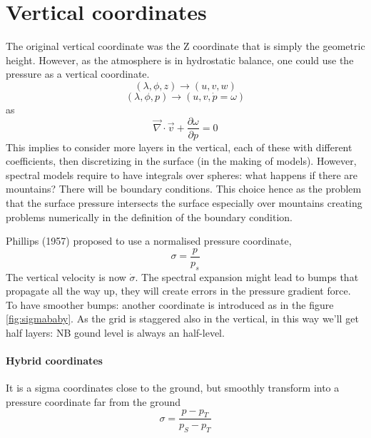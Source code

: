 \section{Vertical coordinates}
The original vertical coordinate was the Z coordinate that is simply the
geometric height. However, as the atmosphere is in hydrostatic balance, one could use the pressure as a vertical coordinate.
$$(\lambda, \phi, z)\rightarrow(u,v,w) $$
$$(\lambda, \phi, p)\rightarrow (u,v,\dot{p}=\omega)$$
as $$\vec{\nabla}\cdot\vec{v}+\frac{\partial\omega}{\partial p}=0$$
This implies to consider more layers in the vertical, each of these with different coefficients, then discretizing in the surface (in the making of models).
However, spectral models require to have integrals over spheres: what happens if there are mountains? There will be boundary conditions.
This choice hence as the problem that the surface pressure intersects the surface especially over mountains creating problems numerically in the definition of the boundary condition.

Phillips (1957) proposed to use a normalised pressure coordinate, $$\sigma=\frac{p}{p_s}$$ The vertical velocity is now $\dot{\sigma}$. The spectral expansion might lead to bumps that propagate all the way up, they will create errors in the pressure gradient force. To have smoother bumps: another coordinate is introduced as in the figure \ref{fig:sigmababy}. As the grid is staggered also in the vertical, in this way we'll get half layers: NB gound level is always an half-level.
\paragraph{Hybrid coordinates}
It is a sigma coordinates close to the ground, but smoothly transform into a
pressure coordinate far from the ground $$\sigma=\frac{p-p_T}{p_S-p_T}$$
